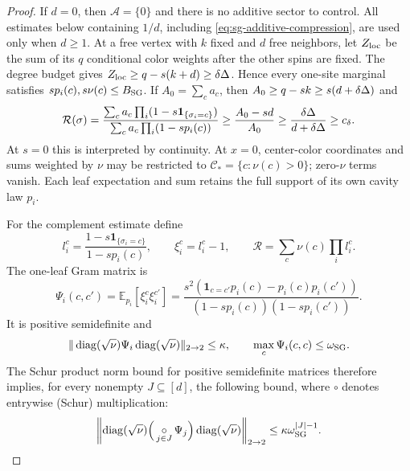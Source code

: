 \begin{proof}
If $d=0$, then $\mathcal A=\{0\}$ and there is no additive sector to
control.  All estimates below containing $1/d$, including
\eqref{eq:sg-additive-compression}, are used only when $d\ge1$.
At a free vertex with $k$ fixed and $d$ free neighbors, let $Z_{\rm loc}$
be the sum of its $q$ conditional color weights after the other spins are
fixed.  The degree budget gives
$Z_{\rm loc}\ge q-s(k+d)\ge\delta\Delta$.  Hence every one-site
marginal satisfies $sp_i(c),s\nu(c)\le B_{\rm SG}$.  If
$A_0=\sum_ca_c$, then $A_0\ge q-sk\ge s(d+\delta\Delta)$ and
\[
 \mathcal R(\sigma)=\frac{\sum_ca_c\prod_i(1-s\mathbf1_{\{\sigma_i=c\}})}
 {\sum_ca_c\prod_i(1-sp_i(c))}
 \ge \frac{A_0-sd}{A_0}
 \ge \frac{\delta\Delta}{d+\delta\Delta}\ge c_\delta .
\]
At $s=0$ this is interpreted by continuity.  At $x=0$, center-color
coordinates and sums weighted by $\nu$ may be restricted to
$\mathcal C_*=\{c:\nu(c)>0\}$; zero-$\nu$ terms vanish.
Each leaf expectation and sum retains the full support of its own
cavity law $p_i$.

For the complement estimate define
\[
 l_i^c=\frac{1-s\mathbf1_{\{\sigma_i=c\}}}{1-sp_i(c)},
 \qquad \xi_i^c=l_i^c-1,
 \qquad \mathcal R=\sum_c\nu(c)\prod_i l_i^c .
\]
The one-leaf Gram matrix is
\[
 \Psi_i(c,c')=\mathbb E_{p_i}[\xi_i^c\xi_i^{c'}]
 =\frac{s^2(\mathbf1_{c=c'}p_i(c)-p_i(c)p_i(c'))}
 {(1-sp_i(c))(1-sp_i(c'))}.
\]
It is positive semidefinite and
\begin{equation}\label{eq:sg-gram-bound}
 \|\operatorname{diag}(\sqrt\nu)\Psi_i\operatorname{diag}(\sqrt\nu)\|_{2\to2}
 \le\kappa,\qquad \max_c\Psi_i(c,c)\le \omega_{\rm SG}.
\end{equation}
The Schur product norm bound for positive semidefinite matrices therefore
implies, for every nonempty $J\subseteq[d]$, the following bound, where
$\circ$ denotes entrywise (Schur) multiplication:
\begin{equation}\label{eq:sg-schur-product}
 \left\|\operatorname{diag}(\sqrt\nu)
 \Big(\mathop{\circ}_{j\in J}\Psi_j\Big)
 \operatorname{diag}(\sqrt\nu)\right\|_{2\to2}
 \le\kappa \omega_{\rm SG}^{|J|-1}.
\end{equation}


\end{proof}

